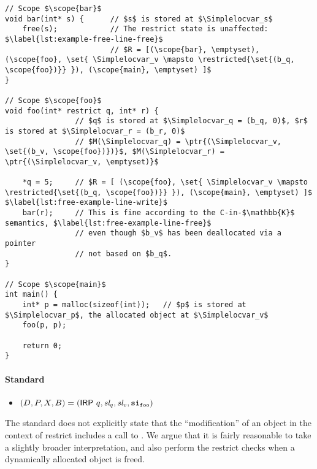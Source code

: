 \begin{code}
\begin{verbatim}
// Scope $\scope{bar}$
void bar(int* s) {      // $s$ is stored at $\Simplelocvar_s$
    free(s);            // The restrict state is unaffected:  $\label{lst:example-free-line-free}$
                        // $R = [(\scope{bar}, \emptyset), (\scope{foo}, \set{ \Simplelocvar_v \mapsto \restricted{\set{(b_q, \scope{foo})}} }), (\scope{main}, \emptyset) ]$
}

// Scope $\scope{foo}$
void foo(int* restrict q, int* r) {
                // $q$ is stored at $\Simplelocvar_q = (b_q, 0)$, $r$ is stored at $\Simplelocvar_r = (b_r, 0)$
                // $M(\Simplelocvar_q) = \ptr{(\Simplelocvar_v, \set{(b_v, \scope{foo})})}$, $M(\Simplelocvar_r) = \ptr{(\Simplelocvar_v, \emptyset)}$

    *q = 5;     // $R = [ (\scope{foo}, \set{ \Simplelocvar_v \mapsto \restricted{\set{(b_q, \scope{foo})}} }), (\scope{main}, \emptyset) ]$ $\label{lst:free-example-line-write}$
    bar(r);     // This is fine according to the C-in-$\mathbb{K}$ semantics, $\label{lst:free-example-line-free}$
                // even though $b_v$ has been deallocated via a pointer
                // not based on $b_q$.
}

// Scope $\scope{main}$
int main() {
    int* p = malloc(sizeof(int));   // $p$ is stored at $\Simplelocvar_p$, the allocated object at $\Simplelocvar_v$
    foo(p, p);                         

    return 0;
}
\end{verbatim}
\caption{Free via an aliasing pointer (TLU)}
\label{lst:example-free-aliasing-ptr}
\end{code}

\paragraph{Standard}

\begin{itemize}
    \itemsep0em
    \item $(D, P, X, B) = (\mathsf{IRP} \ q, \textit{sl}_q, \textit{sl}_v, \mathtt{si}_\mathtt{foo})$
\end{itemize}

The standard does not explicitly state that the ``modification'' of an object in the context of restrict
includes a call to .
We argue that it is fairly reasonable to take a slightly broader interpretation,
and also perform the restrict checks when a dynamically allocated object is freed.
